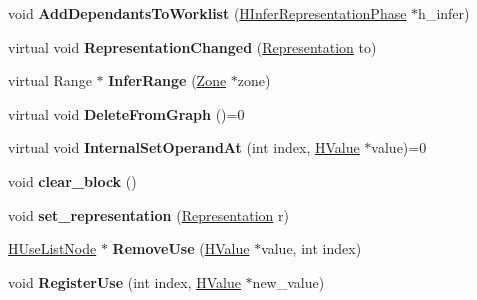 \begin{DoxyCompactItemize}
\item 
\hypertarget{classv8_1_1internal_1_1_h_value_a9d62aefb96a2813e8ed35b87fbef4a7a}{}void {\bfseries Add\+Dependants\+To\+Worklist} (\hyperlink{classv8_1_1internal_1_1_h_infer_representation_phase}{H\+Infer\+Representation\+Phase} $\ast$h\+\_\+infer)\label{classv8_1_1internal_1_1_h_value_a9d62aefb96a2813e8ed35b87fbef4a7a}

\item 
\hypertarget{classv8_1_1internal_1_1_h_value_a03b2d55c6c003ee3116423455cd604dd}{}virtual void {\bfseries Representation\+Changed} (\hyperlink{classv8_1_1internal_1_1_representation}{Representation} to)\label{classv8_1_1internal_1_1_h_value_a03b2d55c6c003ee3116423455cd604dd}

\item 
\hypertarget{classv8_1_1internal_1_1_h_value_aafded10f81e80bbd2d2b52848476edf7}{}virtual Range $\ast$ {\bfseries Infer\+Range} (\hyperlink{classv8_1_1internal_1_1_zone}{Zone} $\ast$zone)\label{classv8_1_1internal_1_1_h_value_aafded10f81e80bbd2d2b52848476edf7}

\item 
\hypertarget{classv8_1_1internal_1_1_h_value_a48e355e95c0d9c7e6620b92ecfe1312e}{}virtual void {\bfseries Delete\+From\+Graph} ()=0\label{classv8_1_1internal_1_1_h_value_a48e355e95c0d9c7e6620b92ecfe1312e}

\item 
\hypertarget{classv8_1_1internal_1_1_h_value_a04561bfe2964422affeafae3c50e7f3f}{}virtual void {\bfseries Internal\+Set\+Operand\+At} (int index, \hyperlink{classv8_1_1internal_1_1_h_value}{H\+Value} $\ast$value)=0\label{classv8_1_1internal_1_1_h_value_a04561bfe2964422affeafae3c50e7f3f}

\item 
\hypertarget{classv8_1_1internal_1_1_h_value_a861273b417af7cf537b13e429d8a5576}{}void {\bfseries clear\+\_\+block} ()\label{classv8_1_1internal_1_1_h_value_a861273b417af7cf537b13e429d8a5576}

\item 
\hypertarget{classv8_1_1internal_1_1_h_value_ab865bf5ef1c94593216663bd940efc75}{}void {\bfseries set\+\_\+representation} (\hyperlink{classv8_1_1internal_1_1_representation}{Representation} r)\label{classv8_1_1internal_1_1_h_value_ab865bf5ef1c94593216663bd940efc75}

\item 
\hypertarget{classv8_1_1internal_1_1_h_value_aed821fc32659ee9bfaf8bdf7744f2bdf}{}\hyperlink{classv8_1_1internal_1_1_h_use_list_node}{H\+Use\+List\+Node} $\ast$ {\bfseries Remove\+Use} (\hyperlink{classv8_1_1internal_1_1_h_value}{H\+Value} $\ast$value, int index)\label{classv8_1_1internal_1_1_h_value_aed821fc32659ee9bfaf8bdf7744f2bdf}

\item 
\hypertarget{classv8_1_1internal_1_1_h_value_aabc095efe342a2a7d7997a01124887d1}{}void {\bfseries Register\+Use} (int index, \hyperlink{classv8_1_1internal_1_1_h_value}{H\+Value} $\ast$new\+\_\+value)\label{classv8_1_1internal_1_1_h_value_aabc095efe342a2a7d7997a01124887d1}

\end{DoxyCompactItemize}

